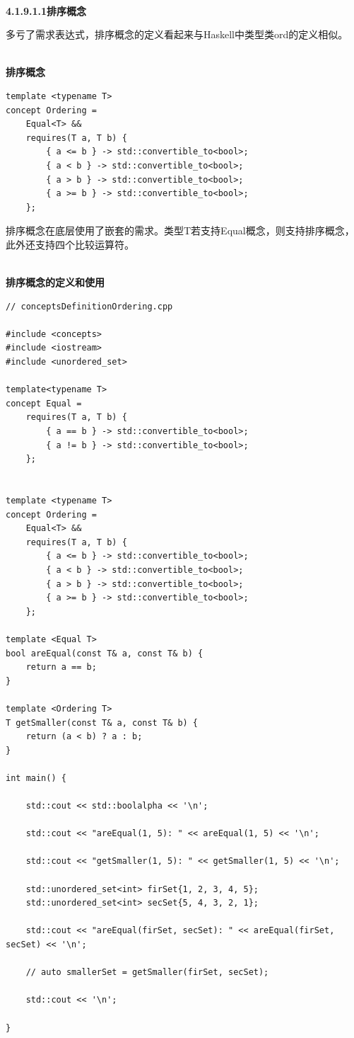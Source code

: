 \hspace*{\fill} \\ %
\noindent
\textbf{4.1.9.1.1\hspace{0.2cm}排序概念}

多亏了需求表达式，排序概念的定义看起来与Haskell中类型类ord的定义相似。

\hspace*{\fill} \\ %
\noindent
\textbf{排序概念}
\begin{lstlisting}[style=styleCXX]
template <typename T>
concept Ordering =
	Equal<T> &&
	requires(T a, T b) {
		{ a <= b } -> std::convertible_to<bool>;
		{ a < b } -> std::convertible_to<bool>;
		{ a > b } -> std::convertible_to<bool>;
		{ a >= b } -> std::convertible_to<bool>;
	};
\end{lstlisting}

排序概念在底层使用了嵌套的需求。类型T若支持Equal概念，则支持排序概念，此外还支持四个比较运算符。

\hspace*{\fill} \\ %
\noindent
\textbf{排序概念的定义和使用}
\begin{lstlisting}[style=styleCXX]
// conceptsDefinitionOrdering.cpp

#include <concepts>
#include <iostream>
#include <unordered_set>

template<typename T>
concept Equal =
	requires(T a, T b) {
		{ a == b } -> std::convertible_to<bool>;
		{ a != b } -> std::convertible_to<bool>;
	};


template <typename T>
concept Ordering =
	Equal<T> &&
	requires(T a, T b) {
		{ a <= b } -> std::convertible_to<bool>;
		{ a < b } -> std::convertible_to<bool>;
		{ a > b } -> std::convertible_to<bool>;
		{ a >= b } -> std::convertible_to<bool>;
	};

template <Equal T>
bool areEqual(const T& a, const T& b) {
	return a == b;
}

template <Ordering T>
T getSmaller(const T& a, const T& b) {
	return (a < b) ? a : b;
}

int main() {

	std::cout << std::boolalpha << '\n';
	
	std::cout << "areEqual(1, 5): " << areEqual(1, 5) << '\n';
	
	std::cout << "getSmaller(1, 5): " << getSmaller(1, 5) << '\n';
	
	std::unordered_set<int> firSet{1, 2, 3, 4, 5};
	std::unordered_set<int> secSet{5, 4, 3, 2, 1};
	
	std::cout << "areEqual(firSet, secSet): " << areEqual(firSet, secSet) << '\n';
	
	// auto smallerSet = getSmaller(firSet, secSet);
	
	std::cout << '\n';

}
\end{lstlisting}

